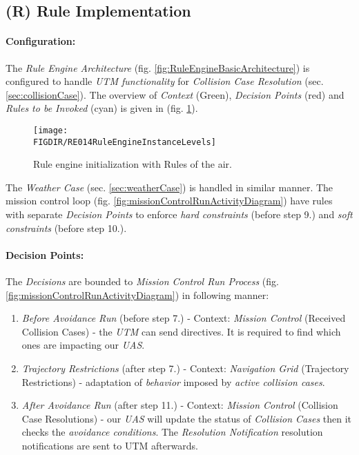 \newpage
\subsection{(R) Rule Implementation}\label{sec:ruleImplementation}

\paragraph{Configuration:} The \emph{Rule Engine Architecture} (fig. \ref{fig:RuleEngineBasicArchitecture}) is configured to handle \emph{UTM functionality} for \emph{Collision Case Resolution} (sec. \ref{sec:collisionCase}).  The overview of \emph{Context} (Green), \emph{Decision Points} (red) and \emph{Rules to be Invoked} (cyan) is given in (fig. \ref{fig:RuleEngineInstanceLevels}). 

\begin{figure}[H]
    \centering
    \texttt{[image: \\FIGDIR/RE014RuleEngineInstanceLevels]} 
    \caption{Rule engine initialization with Rules of the air.}
    \label{fig:RuleEngineInstanceLevels}
\end{figure}

\begin{note}
    The \emph{Weather Case} (sec. \ref{sec:weatherCase}) is handled in similar manner. The mission control loop (fig. \ref{fig:missionControlRunActivityDiagram}) have rules with separate \emph{Decision Points} to enforce \emph{hard constraints} (before step 9.) and \emph{soft constraints} (before step 10.).
\end{note}


\paragraph{Decision Points:} The \emph{Decisions} are bounded to \emph{Mission Control Run Process} (fig. \ref{fig:missionControlRunActivityDiagram}) in following manner:
\begin{enumerate}
    \item \emph{Before Avoidance Run} (before step 7.) - Context: \emph{Mission Control} (Received Collision Cases) - the \emph{UTM} can send  directives. It is required to find which ones are impacting our \emph{UAS}.
    
    \item \emph{Trajectory Restrictions} (after step 7.) - Context: \emph{Navigation Grid} (Trajectory Restrictions) - adaptation of \emph{behavior} imposed by \emph{active collision cases}.
    
    \item \emph{After Avoidance Run} (after step 11.) - Context: \emph{Mission Control} (Collision Case Resolutions) - our \emph{UAS} will update the status of \emph{Collision Cases} then it checks the \emph{avoidance conditions}. The \emph{Resolution Notification} resolution notifications are sent to UTM afterwards.
    
\end{enumerate}

